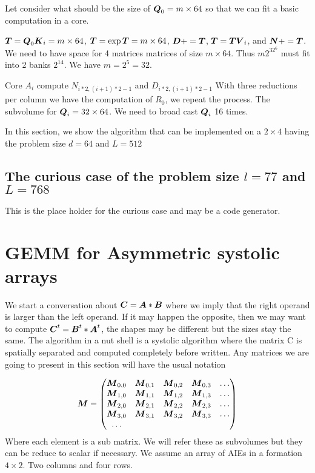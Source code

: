 \documentclass[journal]{IEEEtran}
\begin{document}
Let consider what should be the size of ${\boldsymbol Q}_0 = m \times 64$ so
that we can fit a basic computation in a core.

${\boldsymbol T} = {\boldsymbol Q}_0{\boldsymbol K}_i = m \times 64$, 
${\boldsymbol T} = \exp{{\boldsymbol T}} = m \times 64$,
${\boldsymbol D} += {\boldsymbol T}$, ${\boldsymbol T} = {\boldsymbol T}{\boldsymbol V}_i$, and ${\boldsymbol N} +=
{\boldsymbol T}$. We need to have space for 4 matrices matrices of size $ m
\times 64$. Thus $m2^32^6$ must fit into 2 banks $2^{14}$.  We have $m
= 2^5 = 32$.

Core $A_i$ compute $N_{i*2,(i+1)*2 -1}$ and $D_{i*2,(i+1)*2 -1}$ With
three reductions per column we have the computation of $R_0$, we
repeat the process.  The subvolume for ${\boldsymbol Q}_i = 32\times 64$.  We
need to broad cast ${\boldsymbol Q}_i$ 16 times.



In this section, we show the algorithm that can be implemented on a
$2\times 4$ having the problem size $d=64$ and $L=512$



\subsection{The curious case of the problem size $l=77$ and $L=768$}

This is the place holder for the curious case and may be a code
generator. 


\newpage
\section{GEMM for Asymmetric systolic arrays}

We start a conversation about ${\boldsymbol C} = {\boldsymbol A}*{\boldsymbol B}$ where we imply
that the right operand is larger than the left operand. If it may
happen the opposite, then we may want to compute ${\boldsymbol C}^t =
{\boldsymbol B}^t*{\boldsymbol A}^t$, the shapes may be different but the sizes stay the
same. The algorithm in a nut shell is a systolic algorithm where the
matrix C is spatially separated and computed completely before
written. Any matrices we are going to present in this section will
have the usual notation

\begin{equation*} {\boldsymbol M} =
    \begin{pmatrix}
    {\boldsymbol M}_{0,0} & {\boldsymbol M}_{0,1} & {\boldsymbol M}_{0,2} & {\boldsymbol M}_{0,3} & \dots \\
    {\boldsymbol M}_{1,0} & {\boldsymbol M}_{1,1} & {\boldsymbol M}_{1,2} & {\boldsymbol M}_{1,3} & \dots \\
    {\boldsymbol M}_{2,0} & {\boldsymbol M}_{2,1} & {\boldsymbol M}_{2,2} & {\boldsymbol M}_{2,3} & \dots \\
    {\boldsymbol M}_{3,0} & {\boldsymbol M}_{3,1} & {\boldsymbol M}_{3,2} & {\boldsymbol M}_{3,3} & \dots \\
    \dots
  \end{pmatrix}  
\end{equation*}
Where each element is a sub matrix. We will refer these as subvolumes
but they can be reduce to scalar if necessary.  We assume an array of
AIEs in a formation $4 \times 2$. Two columns and four rows.
\end{document}
